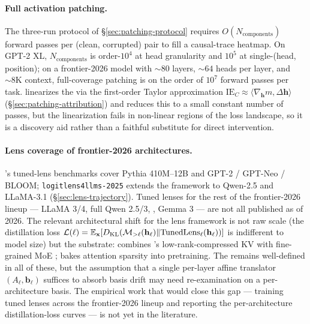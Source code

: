 \paragraph{Full activation patching.}
The three-run protocol of \S\ref{sec:patching-protocol} requires
$O(N_{\mathrm{components}})$ forward passes per (clean, corrupted) pair
to fill a causal-trace heatmap. On GPT-2 XL, $N_{\mathrm{components}}$
is order-$10^4$ at head granularity and $10^5$ at single-(head,
position); on a frontier-2026 model with $\sim 80$ layers, $\sim 64$
heads per layer, and $\sim 8\text{K}$ context, full-coverage patching
is on the order of $10^7$ forward passes per task. 
linearizes the  via the
first-order Taylor approximation
$\mathrm{IE}_C \approx \langle \nabla_{\mathbf{h}} m,
\Delta \mathbf{h} \rangle$
(\S\ref{sec:patching-attribution}) and reduces this to a small constant
number of passes, but the linearization fails in non-linear regions of
the loss landscape, so it is a discovery aid rather than a faithful
substitute for direct intervention.

\paragraph{Lens coverage of frontier-2026 architectures.}
\citet{belrose2023-tuned-lens}'s tuned-lens benchmarks cover Pythia
410M--12B and GPT-2 / GPT-Neo / BLOOM; \texttt{logitlens4llms-2025}
extends the framework to Qwen-2.5 and LLaMA-3.1
(\S\ref{sec:lens-trajectory}). Tuned lenses for the rest of the
frontier-2026 lineup --- LLaMA 3/4, full Qwen 2.5/3, ,
Gemma 3 --- are not all published as of 2026. The relevant
architectural shift for the lens framework is not raw scale (the
distillation loss
$\mathcal{L}(\ell) = \operatorname{\mathbb{E}}_{\mathbf{x}}[D_{\mathrm{KL}}(\mathcal{M}_{>\ell}
(\mathbf{h}_\ell) \| \mathrm{TunedLens}_\ell(\mathbf{h}_\ell))]$ is
indifferent to model size) but the substrate:  combines 
\citep{deepseek-v2}'s low-rank-compressed KV with fine-grained MoE
\citep{deepseekmoe2024};  \citep{yuan2025} bakes attention sparsity
into pretraining. The  remains well-defined in all of
these, but the assumption that a single per-layer affine translator
$(A_\ell, \mathbf{b}_\ell)$ suffices to absorb basis drift may need
re-examination on a per-architecture basis. The empirical work that
would close this gap --- training tuned lenses across the frontier-2026
lineup and reporting the per-architecture distillation-loss curves ---
is not yet in the literature.

